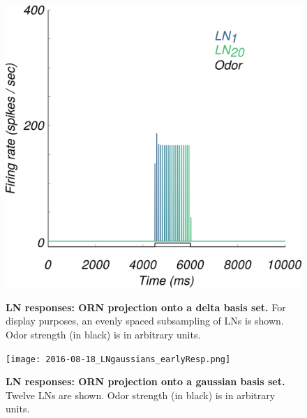 \documentclass[a4paper,12pt,twoside]{article}
\begin{document}
\begin{figure}
\centering
\caption{\textbf{LN responses: ORN projection onto a delta basis set.}  For display purposes, an evenly spaced subsampling of LNs is shown.  Odor strength (in black) is in arbitrary units.}
\hspace*{-1.5cm}
\includegraphics[scale=0.3]{2016-08-15_LNdelayExample.png}
\label{fig:ln3}
\end{figure}

\begin{figure}
\centering
\caption{\textbf{LN responses: ORN projection onto a gaussian basis set.}  Twelve LNs are shown.  Odor strength (in black) is in arbitrary units.}
\hspace*{-1.5cm}
\texttt{[image: 2016-08-18\_LNgaussians\_earlyResp.png]}
\label{fig:ln4}
\end{figure}
\end{document}

